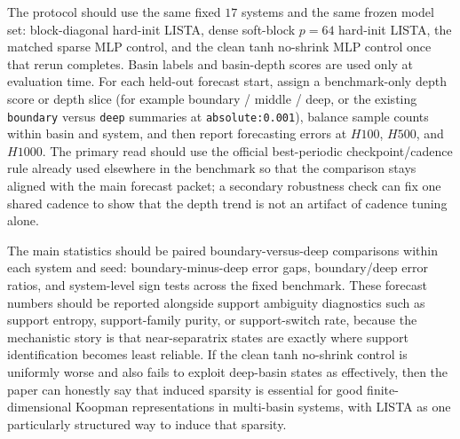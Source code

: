 The protocol should use the same fixed $17$ systems and the same frozen model
set: block-diagonal hard-init LISTA, dense soft-block $p=64$ hard-init LISTA,
the matched sparse MLP control, and the clean tanh no-shrink MLP control once
that rerun completes. Basin labels and basin-depth scores are used only at
evaluation time. For each held-out forecast start, assign a benchmark-only
depth score or depth slice (for example boundary / middle / deep, or the
existing \texttt{boundary} versus \texttt{deep} summaries at
\texttt{absolute:0.001}), balance sample counts within basin and system, and
then report forecasting errors at $H100$, $H500$, and $H1000$. The primary
read should use the official best-periodic checkpoint/cadence rule already used
elsewhere in the benchmark so that the comparison stays aligned with the main
forecast packet; a secondary robustness check can fix one shared cadence to
show that the depth trend is not an artifact of cadence tuning alone.

The main statistics should be paired boundary-versus-deep comparisons within
each system and seed: boundary-minus-deep error gaps, boundary/deep error
ratios, and system-level sign tests across the fixed benchmark. These forecast
numbers should be reported alongside support ambiguity diagnostics such as
support entropy, support-family purity, or support-switch rate, because the
mechanistic story is that near-separatrix states are exactly where support
identification becomes least reliable. If the clean tanh no-shrink control is
uniformly worse and also fails to exploit deep-basin states as effectively,
then the paper can honestly say that induced sparsity is essential for good
finite-dimensional Koopman representations in multi-basin systems, with LISTA
as one particularly structured way to induce that sparsity.
